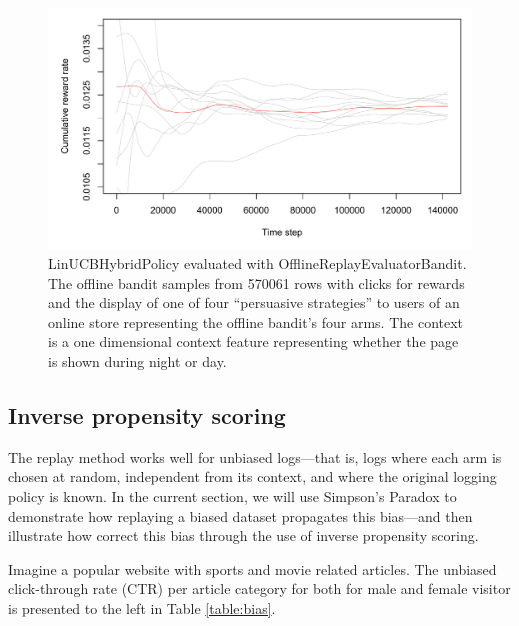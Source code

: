 \documentclass{jss}
\begin{document}
\begin{figure}[H]
  \centering
    \includegraphics[width=.99\textwidth]{fig/offline_bandit}

      \caption{LinUCBHybridPolicy evaluated with OfflineReplayEvaluatorBandit. The offline bandit samples from 570061 rows with clicks for rewards and the display of one of four “persuasive strategies” to users of an online store representing the offline bandit's four arms. The context is a one dimensional context feature representing whether the page is shown during night or day. }
      \label{fig:offline_bandit}
\end{figure}


\subsection{Inverse propensity scoring} \label{prop}

The replay method works well for unbiased logs---that is, logs where each arm is chosen at random, independent from its context, and where the original logging policy is known. In the current section, we will use Simpson's Paradox to demonstrate how replaying a biased dataset propagates this bias---and then illustrate how correct this bias through the use of inverse propensity scoring.

Imagine a popular website with sports and movie related articles. The unbiased click-through rate (CTR) per article category for both for male and female visitor is presented to the left in Table \ref{table:bias}.
\end{document}
